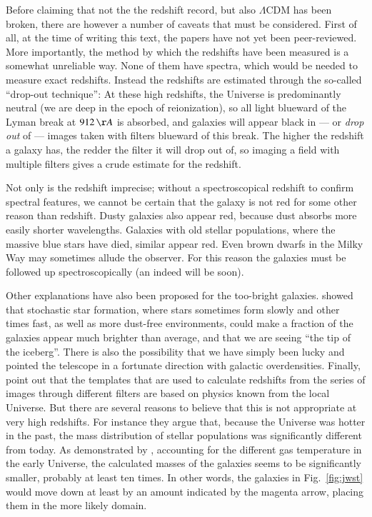 \documentclass[useAMS,usenatbib,bibyear]{aa}
\begin{document}
Before claiming that not the the redshift record, but also $\Lambda$CDM has been broken, there are however a number of caveats that must be considered.
First of all, at the time of writing this text, the papers have not yet been peer-reviewed.
More importantly, the method by which the redshifts have been measured is a somewhat unreliable way. None of them have spectra, which would be needed to measure exact redshifts. Instead the redshifts are estimated through the so-called ``drop-out technique'': At these high redshifts, the Universe is predominantly neutral (we are deep in the epoch of reionization), so all light blueward of the Lyman break at $912\,{\AA}$ is absorbed, and galaxies will appear black in --- or \emph{drop out} of --- images taken with filters blueward of this break.
The higher the redshift a galaxy has, the redder the filter it will drop out of, so imaging a field with multiple filters gives a crude estimate for the redshift.

Not only is the redshift imprecise; without a spectroscopical redshift to confirm spectral features, we cannot be certain that the galaxy is not red for some other reason than redshift. Dusty galaxies also appear red, because dust absorbs more easily shorter wavelengths. Galaxies with old stellar populations, where the massive blue stars have died, similar appear red. Even brown dwarfs in the Milky Way may sometimes allude the observer.
For this reason the galaxies must be followed up spectroscopically (an indeed will be soon).

Other explanations have also been proposed for the too-bright galaxies.
\citet{Mason2022} showed that stochastic star formation, where stars sometimes form slowly and other times fast, as well as more dust-free environments, could make a fraction of the galaxies appear much brighter than average, and that we are seeing ``the tip of the iceberg''.
There is also the possibility that we have simply been lucky and pointed the telescope in a fortunate direction with galactic overdensities.
Finally, \citet{Steinhardt2022} point out that the templates that are used to calculate redshifts from the series of images through different filters are based on physics known from the local Universe. But there are several reasons to believe that this is not appropriate at very high redshifts. For instance they argue that, because the Universe was hotter in the past, the mass distribution of stellar populations was significantly different from today.
As demonstrated by \citet{Sneppen2022}, accounting for the different gas temperature in the early Universe, the calculated masses of the galaxies seems to be significantly smaller, probably at least ten times.
In other words, the galaxies in Fig.~\ref{fig:jwst} would move down at least by an amount indicated by the magenta arrow, placing them in the more likely domain.
\end{document}

